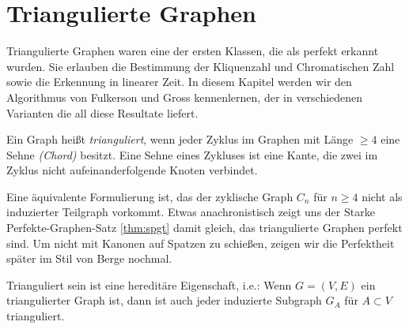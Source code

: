 \documentclass[../main.tex]{subfiles}
\begin{document}
\chapter{Triangulierte Graphen}
\label{chapter:trigulated}

Triangulierte Graphen waren eine der ersten Klassen, die als perfekt erkannt wurden. Sie erlauben die Bestimmung der Kliquenzahl und Chromatischen Zahl sowie die Erkennung in linearer Zeit. In diesem Kapitel werden wir den Algorithmus von Fulkerson und Gross kennenlernen, der in verschiedenen Varianten die all diese Resultate liefert.

\begin{definition}
    Ein Graph heißt \emph{trianguliert}, wenn jeder Zyklus im Graphen mit Länge $\geq 4$ eine Sehne \emph{(Chord)} besitzt. Eine Sehne eines Zykluses ist eine Kante, die zwei im Zyklus nicht aufeinanderfolgende Knoten verbindet.
\end{definition}

Eine äquivalente Formulierung ist, das der zyklische Graph $C_n$ für $n\geq 4$ nicht als induzierter Teilgraph vorkommt. Etwas anachronistisch zeigt uns der Starke Perfekte-Graphen-Satz \ref{thm:spgt} damit gleich, das triangulierte Graphen perfekt sind. Um nicht mit Kanonen auf Spatzen zu schießen, zeigen wir die Perfektheit später im Stil von Berge nochmal.

Trianguliert sein ist eine hereditäre Eigenschaft, i.e.: Wenn $G = (V, E)$ ein triangulierter Graph ist, dann ist auch jeder induzierte Subgraph $G_A$ für $A \subset V$ trianguliert.
\end{document}
